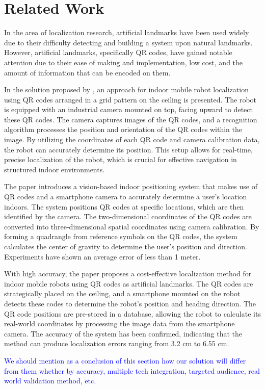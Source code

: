 \section{Related Work}

In the area of localization research, artificial landmarks have been used widely due to their difficulty detecting and building a system upon natural landmarks. However, artificial landmarks, specifically QR codes, have gained notable attention due to their ease of making and implementation, low cost, and the amount of information that can be encoded on them.



In the solution proposed by \cite{zhang2015}, an approach for indoor mobile robot localization using QR codes arranged in a grid pattern on the ceiling is presented. The robot is equipped with an industrial camera mounted on top, facing upward to detect these QR codes. The camera captures images of the QR codes, and a recognition algorithm processes the position and orientation of the QR codes within the image. By utilizing the coordinates of each QR code and camera calibration data, the robot can accurately determine its position. This setup allows for real-time, precise localization of the robot, which is crucial for effective navigation in structured indoor environments.

The paper \cite{kim2021} introduces a vision-based indoor positioning system that makes use of QR codes and a smartphone camera to accurately determine a user's location indoors. The system positions QR codes at specific locations, which are then identified by the camera. The two-dimensional coordinates of the QR codes are converted into three-dimensional spatial coordinates using camera calibration. By forming a quadrangle from reference symbols on the QR codes, the system calculates the center of gravity to determine the user's position and direction. Experiments have shown an average error of less than 1 meter.

With high accuracy, the paper \cite{lee2015} proposes a cost-effective localization method for indoor mobile robots using QR codes as artificial landmarks. The QR codes are strategically placed on the ceiling, and a smartphone mounted on the robot detects these codes to determine the robot's position and heading direction. The QR code positions are pre-stored in a database, allowing the robot to calculate its real-world coordinates by processing the image data from the smartphone camera. The accuracy of the system has been confirmed, indicating that the method can produce localization errors ranging from 3.2 cm to 6.55 cm.

\textcolor{blue}{We should mention as a conclusion of this section how our solution will differ from them whether by accuracy, multiple tech integration, targeted audience, real world validation method, etc.}
